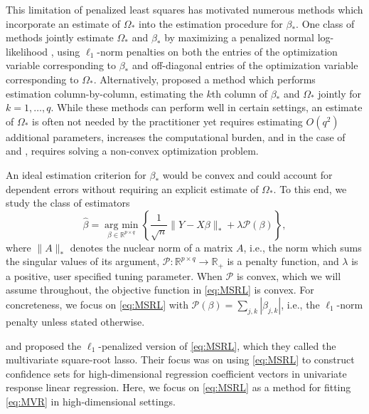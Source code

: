 \documentclass[12pt]{article}
\newcommand{\argmin}{\operatorname*{arg \ min}}
\begin{document}
This limitation of penalized least squares has motivated numerous methods which incorporate an estimate of $\Omega_*$ into the estimation procedure for $\beta_*$. One class of methods jointly estimate $\Omega_*$ and $\beta_*$ by maximizing a penalized normal log-likelihood \citep{rothman2010sparse,yin2011sparse}, using $\ell_1$-norm penalties on both the entries of the optimization variable corresponding to $\beta_*$ and off-diagonal entries of the optimization variable corresponding to $\Omega_*$. Alternatively, \citet{wang2015joint} proposed a method which performs estimation column-by-column, estimating the $k$th column of $\beta_*$ and $\Omega_*$ jointly for $k=1,\dots, q$. While these methods can perform well in certain settings, an estimate of $\Omega_*$ is often not needed by the practitioner yet requires estimating $O(q^2)$ additional parameters, increases the computational burden, and in the case of \citet{rothman2010sparse} and \citet{yin2011sparse}, requires solving a non-convex optimization problem. 

An ideal estimation criterion for $\beta_*$ would be convex and could account for dependent errors without requiring an explicit estimate of $\Omega_*$. To this end, we study the class of estimators 
\begin{equation} \label{eq:MSRL}
\hat{\beta} = \argmin_{\beta \in \mathbb{R}^{p \times q}} \left\{ \frac{1}{\sqrt{n}}\| Y - X \beta\|_{*} + \lambda \mathcal{P}(\beta) \right\},
\end{equation}
where $\|A\|_*$ denotes the nuclear norm of a matrix $A$, i.e., the norm which sums the singular values of its argument, $\mathcal{P}:\mathbb{R}^{p \times q} \to \mathbb{R}_+$ is a penalty function, and $\lambda$ is a positive, user specified tuning parameter. When $\mathcal{P}$ is convex, which we will assume throughout, the objective function in \eqref{eq:MSRL} is convex. For concreteness, we focus on \eqref{eq:MSRL} with $\mathcal{P}(\beta) = \sum_{j,k}|\beta_{j,k}|$, i.e., the $\ell_1$-norm penalty unless stated otherwise. %

\citet{van2016chi2} and \citet{van2016estimation} proposed the $\ell_1$-penalized version of \eqref{eq:MSRL}, which they called the multivariate square-root lasso. Their focus was on using \eqref{eq:MSRL} to construct confidence sets for high-dimensional regression coefficient vectors in univariate response linear regression. Here, we focus on \eqref{eq:MSRL} as a method for fitting \eqref{eq:MVR} in high-dimensional settings. 
\end{document}
